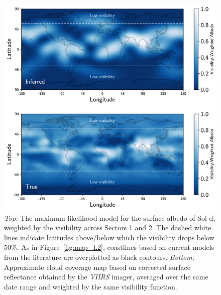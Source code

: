 \documentclass[modern]{aastex62}
\begin{document}
\begin{figure}[p!]
    \begin{centering}
    \includegraphics[width=\linewidth]{figures/map.pdf}
    \caption{\label{fig:map}
             \emph{Top:} The maximum likelihood model for the surface albedo
             of Sol d, weighted by the visibility across Sectors 1 and 2. The
             dashed white lines indicate latitudes above/below which the
             visibility drops below 50\%. As in Figure~\ref{fig:map_L2}, coastlines 
             based on current models from the literature are overplotted as black contours.
             \emph{Bottom:} Approximate cloud coverage map based on corrected
             surface reflectance obtained by the
             \emph{VIIRS} imager, averaged over the same date range and weighted
             by the same visibility function.
             }
    \end{centering}
\end{figure}
\end{document}
